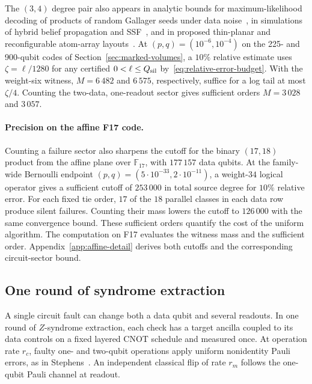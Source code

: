 \documentclass[10pt,twocolumn]{article}
\theoremstyle{definition}
\begin{document}
The $(3,4)$ degree pair also appears in analytic bounds for
maximum-likelihood decoding of products of random Gallager seeds
under data noise~\cite{KPDP18}, in simulations of hybrid belief
propagation and SSF~\cite{GGKL21}, and in proposed thin-planar and
reconfigurable atom-array layouts~\cite{TDB22,Xu24}. At $(p,q)=(10^{-6},10^{-4})$ on the 225- and 900-qubit codes
of Section~\ref{sec:marked-volumes}, a $10\%$ relative estimate uses
$\zeta=\ell/1280$ for any certified $0<\ell\le Q_{\rm sil}$
by~\eqref{eq:relative-error-budget}. With the weight-six witness,
$M=6\,482$ and $6\,575$, respectively, suffice for a log tail at most
$\zeta/4$. Counting the two-data, one-readout sector gives sufficient
orders $M=3\,028$ and $3\,057$.

\begin{samepage}
\label{sec:f17}
\paragraph{Precision on the affine F17 code.}
Counting a failure sector also sharpens the cutoff for the binary
$(17,18)$ product from the affine plane over $\mathbb F_{17}$, with
$177\,157$ data qubits. At the family-wide Bernoulli endpoint
$(p,q)=(5\cdot10^{-33},2\cdot10^{-11})$, a weight-$34$ logical
operator gives a sufficient cutoff of $253\,000$ in total source
degree for $10\%$ relative error. For each fixed tie order, $17$ of
the $18$ parallel classes in each data row produce silent failures.
Counting their mass lowers the cutoff to $126\,000$ with the same
convergence bound. These sufficient orders quantify the cost of the
uniform algorithm. The computation on F17 evaluates the witness
mass and the sufficient order. Appendix~\ref{app:affine-detail} derives both
cutoffs and the corresponding circuit-sector bound.\par
\end{samepage}

\subsection{One round of syndrome extraction}\label{sec:circuit}
A single circuit fault can change both a data qubit and several
readouts. In one round of $Z$-syndrome extraction, each check has a
target ancilla coupled to its data controls on a fixed layered CNOT
schedule and measured once. At operation rate $r_c$, faulty one- and
two-qubit operations apply uniform nonidentity Pauli errors, as in
Stephens~\cite[Sec.~V.C]{Stephens14}. An independent classical flip
of rate $r_m$ follows the one-qubit Pauli channel at readout.
\end{document}
